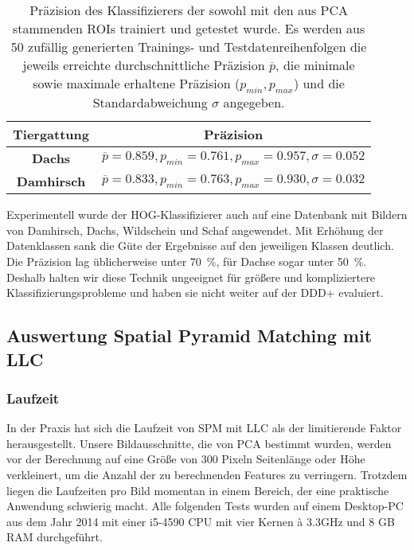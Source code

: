 \begin{table}[]
	\centering
	\caption{Präzision des Klassifizierers der sowohl mit den aus PCA stammenden ROIs trainiert und getestet wurde. Es werden aus 50 zufällig generierten Trainings- und Testdatenreihenfolgen die jeweils erreichte durchschnittliche Präzision $\overline{p}$, die minimale sowie maximale erhaltene Präzision ($p_{min}, p_{max}$) und die Standardabweichung $\sigma$ angegeben. }
	\label{tab:HOG:ResultsAuto}
	\begin{tabular}{cl}
		\hline
		\textbf{Tiergattung} 	       & \multicolumn{1}{c}{\textbf{Präzision}}                                                                                                                                                  \\ \hline
		\textbf{Dachs}                         &$\overline{p}= 0.859, p_{min}=0.761, p_{max}=0.957, \sigma=0.052$ \\
		\textbf{Damhirsch}                &$\overline{p}=0.833, p_{min}=0.763, p_{max}=0.930, \sigma=0.032$ \\
		\hline
	\end{tabular}
\end{table}

Experimentell wurde der HOG-Klassifizierer auch auf eine Datenbank mit Bildern von Damhirsch, Dachs, Wildschein und Schaf angewendet. Mit Erhöhung der Datenklassen sank die Güte der Ergebnisse auf den jeweiligen Klassen deutlich. Die Präzision lag üblicherweise unter 70~\%, für Dachse sogar unter 50~\%. Deshalb halten wir diese Technik ungeeignet für größere und kompliziertere Klassifizierungsprobleme und haben sie nicht weiter auf der DDD+ evaluiert.

\subsection{Auswertung Spatial Pyramid Matching mit LLC}

\subsubsection{Laufzeit}

In der Praxis hat sich die Laufzeit von SPM mit LLC als der limitierende Faktor herausgestellt. Unsere Bildausschnitte, die von PCA bestimmt wurden, werden vor der Berechnung auf eine Größe von 300 Pixeln Seitenlänge oder Höhe verkleinert, um die Anzahl der zu berechnenden Features zu verringern. Trotzdem liegen die Laufzeiten pro Bild momentan in einem Bereich, der eine praktische Anwendung schwierig macht. Alle folgenden Tests wurden auf einem Desktop-PC aus dem Jahr 2014 mit einer i5-4590 CPU mit vier Kernen à 3.3GHz und 8 GB RAM durchgeführt.


